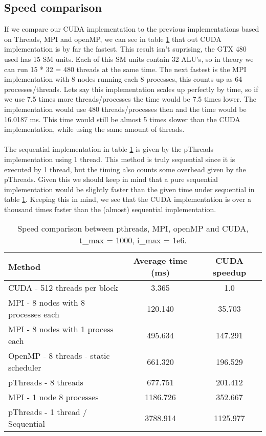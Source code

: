 \documentclass[a4paper]{article}
\begin{document}
	\subsection{Speed comparison}
		If we compare our CUDA implementation to the previous implementations based on Threads, MPI and openMP, we can see in table \ref{table:speedComparison} that out CUDA implementation is by far the fastest.
		This result isn't suprising, the GTX 480 used has 15 SM units.
		Each of this SM units contain 32 ALU's, so in theory we can run 15 * 32 = 480 threads at the same time.
		The next fastest is the MPI implementation with 8 nodes running each 8 processes, this counts up as 64 processes/threads.
		Lets say this implementation scales up perfectly by time, so if we use 7.5 times more threads/processes the time would be 7.5 times lower.
		The implementation would use 480 threads/processes then and the time would be 16.0187 ms.
		This time would still be almost 5 times slower than the CUDA implementation, while using the same amount of threads.\\
		\\
		The sequential implementation in table \ref{table:speedComparison} is given by the pThreads implementation using 1 thread.
		This method is truly sequential since it is executed by 1 thread, but the timing also counts some overhead given by the pThreads.
		Given this we should keep in mind that a pure sequential implementation would be slightly faster than the given time under sequential in table \ref{table:speedComparison}.
		Keeping this in mind, we see that the CUDA implementation is over a thousand times faster than the (almost) sequential implementation.
		
		\begin{table}[H]
			\label{table:speedComparison}
			\caption{Speed comparison between pthreads, MPI, openMP and CUDA, t\_max = 1000, i\_max = 1e6.}
			\begin{center}
				\begin{tabular}{| l | c | c |}
					\hline
					Method & Average time (ms) & CUDA speedup\\
					\hline
					CUDA - 512 threads per block & 3.365 & 1.0\\
					\hline
					MPI - 8 nodes with 8 processes each & 120.140 & 35.703\\
					\hline
					MPI - 8 nodes with 1 process each & 495.634 & 147.291\\
					\hline
					OpenMP - 8 threads - static scheduler & 661.320 & 196.529\\
					\hline
					pThreads - 8 threads & 677.751 & 201.412\\
					\hline
					MPI - 1 node 8 processes & 1186.726 & 352.667\\
					\hline
					pThreads - 1 thread / Sequential & 3788.914 & 1125.977\\
					\hline
				\end{tabular}
			\end{center}
		\end{table}
	
\end{document}

